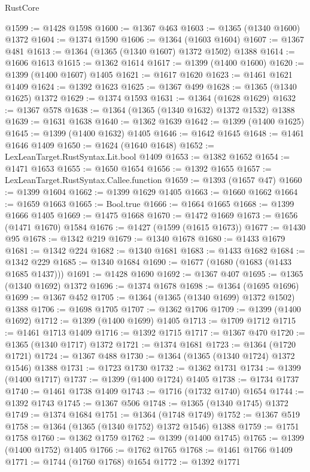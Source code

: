 \begin{lexlean}{RustCore}
\begin{coremodule}
@1599 := @1428 @1598
@1600 := @1367 @463
@1603 := @1365 (@1340 @1600) @1372
@1604 := @1374 @1590
@1606 := @1364 (@1603 @1604)
@1607 := @1367 @481
@1613 := @1364 (@1365 (@1340 @1607) @1372 @1502) @1388
@1614 := @1606 @1613
@1615 := @1362 @1614
@1617 := @1399 (@1400 @1600)
@1620 := @1399 (@1400 @1607) @1405
@1621 := @1617 @1620
@1623 := @1461 @1621 @1409
@1624 := @1392 @1623
@1625 := @1367 @499
@1628 := @1365 (@1340 @1625) @1372
@1629 := @1374 @1593
@1631 := @1364 (@1628 @1629)
@1632 := @1367 @578
@1638 := @1364 (@1365 (@1340 @1632) @1372 @1532) @1388
@1639 := @1631 @1638
@1640 := @1362 @1639
@1642 := @1399 (@1400 @1625)
@1645 := @1399 (@1400 @1632) @1405
@1646 := @1642 @1645
@1648 := @1461 @1646 @1409
@1650 := @1624 (@1640 @1648)
@1652 := LexLeanTarget.RustSyntax.Lit.bool @1409
@1653 := @1382 @1652
@1654 := @1471 @1653
@1655 := @1650 @1654
@1656 := @1392 @1655
@1657 := LexLeanTarget.RustSyntax.Callee.function
@1659 := @1393 (@1657 @47)
@1660 := @1399 @1604
@1662 := @1399 @1629 @1405
@1663 := @1660 @1662
@1664 := @1659 @1663
@1665 := Bool.true
@1666 := @1664 @1665
@1668 := @1399 @1666 @1405
@1669 := @1475 @1668
@1670 := @1472 @1669
@1673 := @1656 (@1471 @1670) @1584
@1676 := @1427 (@1599 (@1615 @1673))
@1677 := @1430 @95
@1678 := @1342 @219
@1679 := @1340 @1678
@1680 := @1433 @1679
@1681 := @1342 @224
@1682 := @1340 @1681
@1683 := @1433 @1682
@1684 := @1342 @229
@1685 := @1340 @1684
@1690 := @1677 (@1680 (@1683 (@1433 @1685 @1437)))
@1691 := @1428 @1690
@1692 := @1367 @407
@1695 := @1365 (@1340 @1692) @1372
@1696 := @1374 @1678
@1698 := @1364 (@1695 @1696)
@1699 := @1367 @452
@1705 := @1364 (@1365 (@1340 @1699) @1372 @1502) @1388
@1706 := @1698 @1705
@1707 := @1362 @1706
@1709 := @1399 (@1400 @1692)
@1712 := @1399 (@1400 @1699) @1405
@1713 := @1709 @1712
@1715 := @1461 @1713 @1409
@1716 := @1392 @1715
@1717 := @1367 @470
@1720 := @1365 (@1340 @1717) @1372
@1721 := @1374 @1681
@1723 := @1364 (@1720 @1721)
@1724 := @1367 @488
@1730 := @1364 (@1365 (@1340 @1724) @1372 @1546) @1388
@1731 := @1723 @1730
@1732 := @1362 @1731
@1734 := @1399 (@1400 @1717)
@1737 := @1399 (@1400 @1724) @1405
@1738 := @1734 @1737
@1740 := @1461 @1738 @1409
@1743 := @1716 (@1732 @1740) @1654
@1744 := @1392 @1743
@1745 := @1367 @506
@1748 := @1365 (@1340 @1745) @1372
@1749 := @1374 @1684
@1751 := @1364 (@1748 @1749)
@1752 := @1367 @519
@1758 := @1364 (@1365 (@1340 @1752) @1372 @1546) @1388
@1759 := @1751 @1758
@1760 := @1362 @1759
@1762 := @1399 (@1400 @1745)
@1765 := @1399 (@1400 @1752) @1405
@1766 := @1762 @1765
@1768 := @1461 @1766 @1409
@1771 := @1744 (@1760 @1768) @1654
@1772 := @1392 @1771

\end{coremodule}
\end{lexlean}
